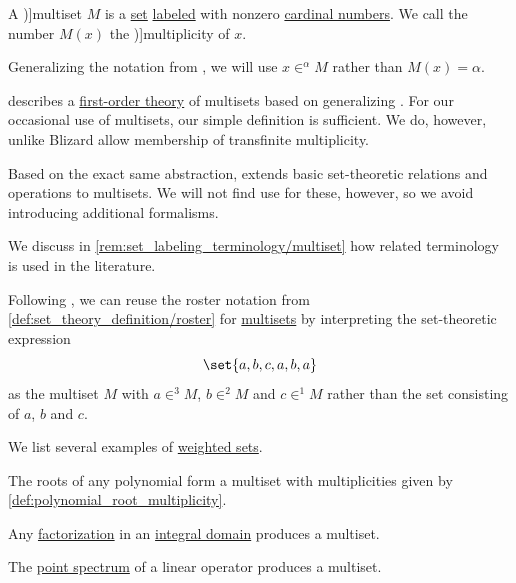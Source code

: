 \begin{definition}\label{def:multiset}
  A \term[ru=мультимножество (\cite[28]{Новиков2013ДискретнаяМатематика})]{multiset} \( M \) is a \hyperref[def:set]{set} \hyperref[def:labeled_set]{labeled} with nonzero \hyperref[def:cardinal]{cardinal numbers}. We call the number \( M(x) \) the \term[en=multiplicity (\cite[36]{Blizard1988MultisetTheory})]{multiplicity} of \( x \).

  Generalizing the notation from \cite[40]{Blizard1988MultisetTheory}, we will use \( x \in^\alpha M \) rather than \( M(x) = \alpha \).
\end{definition}
\begin{comments}
  \item \cite{Blizard1988MultisetTheory} describes a \hyperref[def:fol_theory]{first-order theory} of multisets based on generalizing \hyperref[def:zfc]{}. For our occasional use of multisets, our simple definition is sufficient. We do, however, unlike Blizard allow membership of transfinite multiplicity.

  \item Based on the exact same abstraction,
  \cite{Hickman1980Multisets} extends basic set-theoretic relations and operations to multisets. We will not find use for these, however, so we avoid introducing additional formalisms.

  \item We discuss in \cref{rem:set_labeling_terminology/multiset} how related terminology is used in the literature.
\end{comments}

\begin{remark}\label{rem:syntax_of_multisets}
  Following \cite[309]{Barendregt1984LambdaCalculus}, we can reuse the roster notation from \cref{def:set_theory_definition/roster} for \hyperref[def:multiset]{multisets} by interpreting the set-theoretic expression
  \begin{equation*}
    \set{ a, b, c, a, b, a }
  \end{equation*}
  as the multiset \( M \) with \( a \in^3 M \), \( b \in^2 M \) and \( c \in^1 M \) rather than the set consisting of \( a \), \( b \) and \( c \).
\end{remark}

\begin{example}\label{ex:def:multiset}
  We list several examples of \hyperref[def:labeled_set]{weighted sets}.

  \begin{itemize}
     The roots of any polynomial form a multiset with multiplicities given by \cref{def:polynomial_root_multiplicity}.

     Any \hyperref[def:irreducible_factorization]{factorization} in an \hyperref[def:integral_domain]{integral domain} produces a multiset.

     The \hyperref[def:eigenpair]{point spectrum} of a linear operator produces a multiset.
  \end{itemize}
\end{example}

